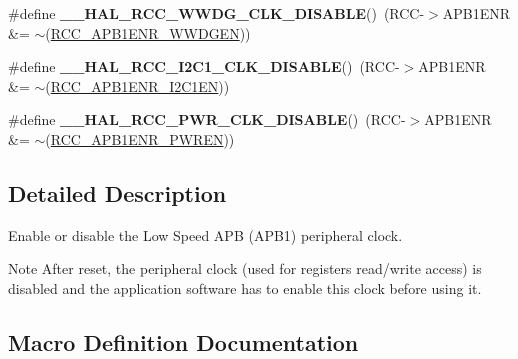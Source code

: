 \begin{DoxyCompactItemize}
\item 
\mbox{\label{group___r_c_c___a_p_b1___clock___enable___disable_ga6afa0a633cf2553743a494d97aa5b997}} 
\#define {\bfseries \+\_\+\+\_\+\+H\+A\+L\+\_\+\+R\+C\+C\+\_\+\+W\+W\+D\+G\+\_\+\+C\+L\+K\+\_\+\+D\+I\+S\+A\+B\+LE}()~(R\+CC-\/$>$A\+P\+B1\+E\+NR \&= $\sim$(\hyperlink{group___peripheral___registers___bits___definition_gaf712b922ee776a972d2efa3da0ea4733}{R\+C\+C\+\_\+\+A\+P\+B1\+E\+N\+R\+\_\+\+W\+W\+D\+G\+EN}))
\item 
\mbox{\label{group___r_c_c___a_p_b1___clock___enable___disable_ga490a853eae72da96aad5379a6e939dd8}} 
\#define {\bfseries \+\_\+\+\_\+\+H\+A\+L\+\_\+\+R\+C\+C\+\_\+\+I2\+C1\+\_\+\+C\+L\+K\+\_\+\+D\+I\+S\+A\+B\+LE}()~(R\+CC-\/$>$A\+P\+B1\+E\+NR \&= $\sim$(\hyperlink{group___peripheral___registers___bits___definition_ga5ca3afe0c517702b2d1366b692c8db0e}{R\+C\+C\+\_\+\+A\+P\+B1\+E\+N\+R\+\_\+\+I2\+C1\+EN}))
\item 
\mbox{\label{group___r_c_c___a_p_b1___clock___enable___disable_gaf3db86d2db2bad45732a742b6a91ea0b}} 
\#define {\bfseries \+\_\+\+\_\+\+H\+A\+L\+\_\+\+R\+C\+C\+\_\+\+P\+W\+R\+\_\+\+C\+L\+K\+\_\+\+D\+I\+S\+A\+B\+LE}()~(R\+CC-\/$>$A\+P\+B1\+E\+NR \&= $\sim$(\hyperlink{group___peripheral___registers___bits___definition_ga5c19997ccd28464b80a7c3325da0ca60}{R\+C\+C\+\_\+\+A\+P\+B1\+E\+N\+R\+\_\+\+P\+W\+R\+EN}))
\end{DoxyCompactItemize}


\subsection{Detailed Description}
Enable or disable the Low Speed A\+PB (A\+P\+B1) peripheral clock. 

\begin{DoxyNote}{Note}
After reset, the peripheral clock (used for registers read/write access) is disabled and the application software has to enable this clock before using it. 
\end{DoxyNote}


\subsection{Macro Definition Documentation}
\mbox{\label{group___r_c_c___a_p_b1___clock___enable___disable_gaaeae5b9e93721dd4e34274600996baeb}} 

